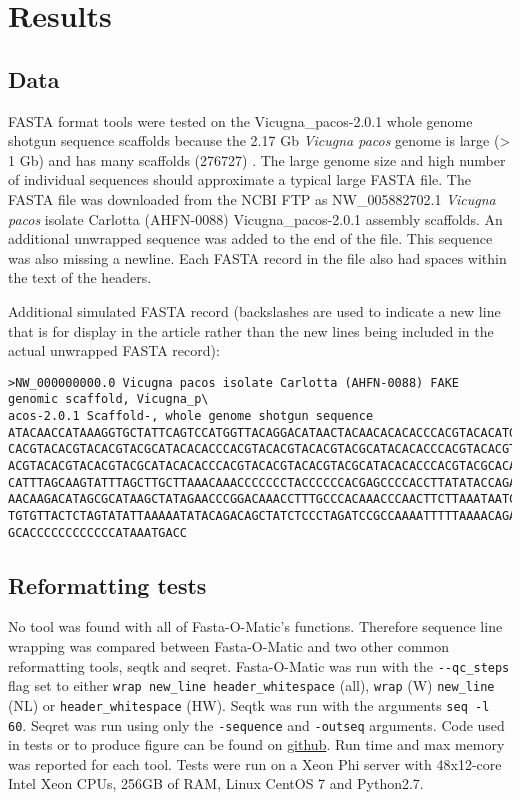 \section{Results}

\subsection{Data}

FASTA format tools were tested on the Vicugna\_pacos-2.0.1 whole genome shotgun sequence scaffolds because the 2.17 Gb \textit{Vicugna pacos} genome is large (> 1 Gb) and has many scaffolds (276727) \cite{Lindblad_Toh_2011}. The large genome size and high number of individual sequences should approximate a typical large FASTA file. The FASTA file was downloaded from the NCBI FTP as NW\_005882702.1 \textit{Vicugna pacos} isolate Carlotta (AHFN-0088) Vicugna\_pacos-2.0.1 assembly scaffolds.
An additional unwrapped sequence was added to the end of the file. This sequence was also missing a newline. Each FASTA record in the file also had spaces within the text of the headers.

Additional simulated FASTA record (backslashes are used to indicate a new line that is for display in the article rather than the new lines being included in the actual unwrapped FASTA record):
\begin{verbatim}
>NW_000000000.0 Vicugna pacos isolate Carlotta (AHFN-0088) FAKE genomic scaffold, Vicugna_p\
acos-2.0.1 Scaffold-, whole genome shotgun sequence
ATACAACCATAAAGGTGCTATTCAGTCCATGGTTACAGGACATAACTACAACACACACCCACGTACACATGCGCATGCGCATGCACACACC\
CACGTACACGTACACGTACGCATACACACCCACGTACACGTACACGTACGCATACACACCCACGTACACGTACACGTACGCATACACACCC\
ACGTACACGTACACGTACGCATACACACCCACGTACACGTACACGTACGCATACACACCCACGTACGCACACACGTACACGTGTAGGCACG\
CATTTAGCAAGTATTTAGCTTGCTTAAACAAACCCCCCCTACCCCCCACGAGCCCCACCTTATATACCAGACAGTCTTGCCAAACCCCAAA\
AACAAGACATAGCGCATAAGCTATAGAACCCGGACAAACCTTTGCCCACAAACCCAACTTCTTAAATAATCACATGGCCAAATCGTACCAA\
TGTGTTACTCTAGTATATTAAAAATATACAGACAGCTATCTCCCTAGATCCGCCAAAATTTTTAAAACAGAATTCAACAACCTTTTTAATG\
GCACCCCCCCCCCCCATAAATGACC
\end{verbatim}

\subsection{Reformatting tests}
No tool was found with all of Fasta-O-Matic's functions. Therefore sequence line wrapping was compared between Fasta-O-Matic and two other common reformatting tools, seqtk and seqret. Fasta-O-Matic was run with the \verb|--qc_steps| flag set to either \verb|wrap new_line header_whitespace| (all), \verb|wrap| (W) \verb|new_line| (NL) or \verb|header_whitespace| (HW). Seqtk was run with the arguments \verb|seq -l 60|. Seqret was run using only the \verb|-sequence| and \verb|-outseq| arguments. Code used in tests or to produce figure can be found on \href{https://github.com/kstatebioinfo/Fasta-O-Matic-a-tool-to-sanity-check-and-if-needed-reformat-FASTA-files/tree/master/figures}{github}. Run time and max memory was reported for each tool. Tests were run on a Xeon Phi server with 48x12-core Intel Xeon CPUs, 256GB of RAM, Linux CentOS 7 and Python2.7.

